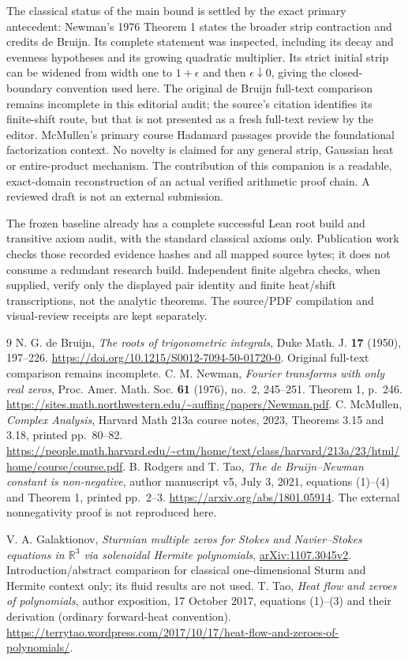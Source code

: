 \documentclass[11pt]{article}
\newcommand{\R}{\mathbb R}\newcommand{\C}{\mathbb C}
\begin{document}
The classical status of the main bound is settled by the exact primary
antecedent: Newman's 1976 Theorem 1 states the broader strip contraction
and credits de Bruijn. Its complete statement was inspected, including
its decay and evenness hypotheses and its growing quadratic multiplier.
Its strict initial strip can be widened from width one to $1+\epsilon$
and then $\epsilon\downarrow0$, giving the closed-boundary convention
used here.
The original de Bruijn full-text comparison remains incomplete in this
editorial audit; the source's citation identifies its finite-shift route,
but that is not presented as a fresh full-text review by the editor.
McMullen's primary course Hadamard passages provide the foundational
factorization context. No novelty is claimed for any general strip,
Gaussian heat or entire-product mechanism. The contribution of this
companion is a readable, exact-domain reconstruction of an actual verified
arithmetic proof chain. A reviewed draft is not an external submission.

The frozen baseline already has a complete successful Lean root build
and transitive axiom audit, with the standard classical axioms only.
Publication work checks those recorded evidence hashes and all mapped
source bytes; it does not consume a redundant research build. Independent
finite algebra checks, when supplied, verify only the displayed pair
identity and finite heat/shift transcriptions, not the analytic theorems.
The source/PDF compilation and visual-review receipts are kept separately.

\begin{thebibliography}{9}
 N. G. de Bruijn,
\emph{The roots of trigonometric integrals}, Duke Math. J. \textbf{17}
(1950), 197--226. \url{https://doi.org/10.1215/S0012-7094-50-01720-0}.
Original full-text comparison remains incomplete.
 C. M. Newman,
\emph{Fourier transforms with only real zeros}, Proc. Amer. Math. Soc.
\textbf{61} (1976), no.~2, 245--251. Theorem 1, p.~246.
\url{https://sites.math.northwestern.edu/~auffing/papers/Newman.pdf}.
 C. McMullen,
\emph{Complex Analysis}, Harvard Math 213a course notes, 2023,
Theorems 3.15 and 3.18, printed pp.~80--82.
\url{https://people.math.harvard.edu/~ctm/home/text/class/harvard/213a/23/html/home/course/course.pdf}.
 B. Rodgers and T. Tao,
\emph{The de Bruijn--Newman constant is non-negative},
author manuscript v5, July 3, 2021, equations (1)--(4) and Theorem 1,
printed pp.~2--3. \url{https://arxiv.org/abs/1801.05914}.
The external nonnegativity proof is not reproduced here.

 V. A. Galaktionov,
\emph{Sturmian multiple zeros for Stokes and Navier--Stokes equations
in $\R^3$ via solenoidal Hermite polynomials},
\href{https://arxiv.org/abs/1107.3045}{arXiv:1107.3045v2}.
Introduction/abstract comparison for classical one-dimensional Sturm
and Hermite context only; its fluid results are not used.
 T. Tao, \emph{Heat flow and zeroes of polynomials},
author exposition, 17 October 2017, equations (1)--(3) and their
derivation (ordinary forward-heat convention).
\url{https://terrytao.wordpress.com/2017/10/17/heat-flow-and-zeroes-of-polynomials/}.
\end{thebibliography}
\end{document}
